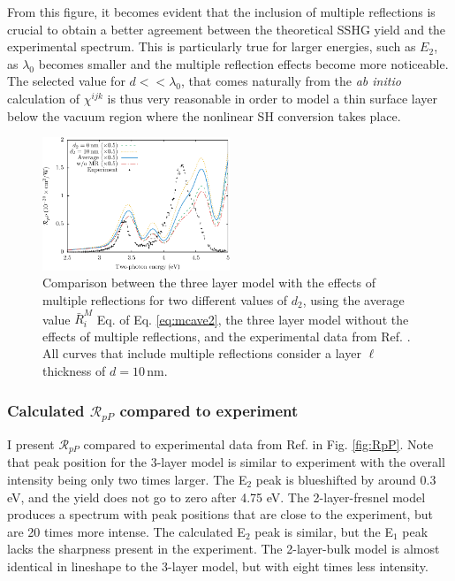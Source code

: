 From this figure, it becomes evident that the inclusion of multiple reflections is crucial to obtain a better agreement between the theoretical SSHG yield and the experimental spectrum. This is particularly true for larger energies, such as $E_{2}$, as $\lambda_{0}$ becomes smaller and the multiple reflection effects become more noticeable. The selected value for $d << \lambda_{0}$, that comes naturally from the \emph{ab initio} calculation of $\chi^{ijk}$ is thus very reasonable in order to model a thin surface layer below the vacuum region where the nonlinear SH conversion takes place.

\begin{figure}[H]
\centering
\includegraphics[width=0.5\textwidth]{content/figures/fig-Si1x1-MRdepth}
\caption{Comparison between the three layer model with the effects of multiple reflections for two different values of $d_{2}$, using the average value $\bar{R}^{M}_{i}$ Eq. of Eq. \eqref{eq:mcave2}, the three layer model without the effects of multiple reflections, and the experimental data from Ref. \cite{mejiaPRB02}. All curves that include multiple reflections consider a layer $\ell$ thickness of $d = 10\,\mathrm{nm}$.}
\label{fig:d2values}
\end{figure}



\subsubsection{Calculated \texorpdfstring{$\mathcal{R}_{pP}$}{RpP} compared to
experiment}

I present $\mathcal{R}_{pP}$ compared to experimental data from Ref.
\cite{mejiaPRB02} in Fig. \ref{fig:RpP}. Note that peak position for the 3-layer
model is similar to experiment with the overall intensity being only two times
larger. The E$_{2}$ peak is blueshifted by around 0.3 eV, and the yield does
not go to zero after 4.75 eV. The 2-layer-fresnel model produces a spectrum
with peak positions that are close to the experiment, but are 20 times more
intense. The calculated E$_{2}$ peak is similar, but the E$_{1}$ peak lacks the
sharpness present in the experiment. The 2-layer-bulk model is almost identical
in lineshape to the 3-layer model, but with eight times less intensity.

